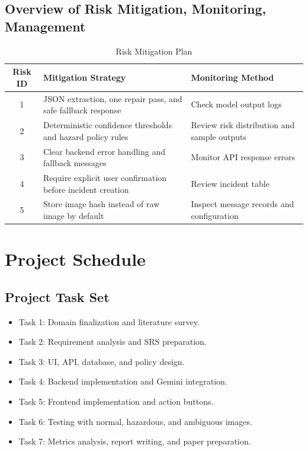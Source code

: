 \subsection{Overview of Risk Mitigation, Monitoring, Management}
\begin{table}[H]
\centering
\caption{Risk Mitigation Plan}
\def\arraystretch{1.4}
\begin{tabularx}{\textwidth}{|c|X|X|}
\hline
\textbf{Risk ID} & \textbf{Mitigation Strategy} & \textbf{Monitoring Method} \\ \hline
1 & JSON extraction, one repair pass, and safe fallback response & Check model output logs \\ \hline
2 & Deterministic confidence thresholds and hazard policy rules & Review risk distribution and sample outputs \\ \hline
3 & Clear backend error handling and fallback messages & Monitor API response errors \\ \hline
4 & Require explicit user confirmation before incident creation & Review incident table \\ \hline
5 & Store image hash instead of raw image by default & Inspect message records and configuration \\ \hline
\end{tabularx}
\end{table}

\section{Project Schedule}
\subsection{Project Task Set}
\begin{itemize}
\item Task 1: Domain finalization and literature survey.
\item Task 2: Requirement analysis and SRS preparation.
\item Task 3: UI, API, database, and policy design.
\item Task 4: Backend implementation and Gemini integration.
\item Task 5: Frontend implementation and action buttons.
\item Task 6: Testing with normal, hazardous, and ambiguous images.
\item Task 7: Metrics analysis, report writing, and paper preparation.
\end{itemize}

